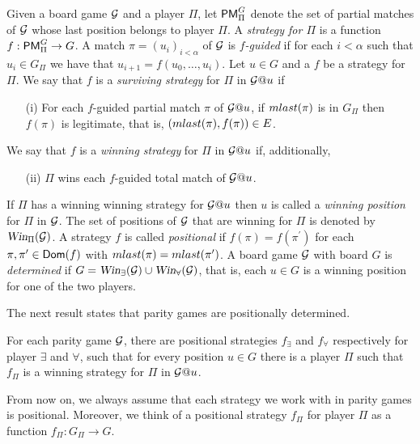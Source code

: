 Given a board game $\mathcal{G}$ and a player $\Pi$, let $\mathsf{PM}^{G}_{\Pi}$ denote
the set of partial matches of $\mathcal{G}$ whose last position belongs to player
$\Pi$.
A \emph{strategy for $\Pi$} is a function $f:\mathsf{PM}^{G}_{\Pi}\to G$.
A match $\pi  = (u_i)_{i< \alpha}$ of $\mathcal{G}$ is
\emph{$f$-guided} if for each $i < \alpha$ such that $u_i \in G_{\Pi}$ we
have that $u_{i+1} = f(u_0,\dots,u_i)$.
%
Let $u \in G$ and a $f$ be a strategy for $\Pi$.
We say that $f$ is a \emph{surviving strategy} for $\Pi$ in $\mathcal{G}@u$ if
%
\begin{enumerate}
  \item[(i)] For each $f$-guided partial match $\pi$ of $\mathcal{G}@u$, if $m{last}(\pi)$
  is in $G_{\Pi}$ then $f(\pi)$ is legitimate, that is,
  $(m{last}(\pi),f(\pi)) \in E$.
\end{enumerate}
%
We say that $f$ is a \emph{winning strategy} for $\Pi$ in $\mathcal{G}@u$ if, additionally, %
%
\begin{enumerate}
  \item[(ii)] $\Pi$ wins each $f$-guided total match of $\mathcal{G}@u$.
\end{enumerate}
%
If $\Pi$ has a winning winning strategy for $\mathcal{G}@u$ then $u$ is called a \emph{winning position} for $\Pi$ in $\mathcal{G}$.
The set of positions of $\mathcal{G}$ that are winning for $\Pi$ is denoted by $\win_{\Pi}(\mc{G})$.
A strategy $f$ is called \emph{positional} if $f(\pi) = f(\pi^{\prime})$ for each $\pi,\pi^{\prime} \in \mathsf{Dom}(f)$ with $m{last}(\pi) = m{last}(\pi^{\prime})$.
A board game $\mathcal{G}$ with board $G$ is \emph{determined} if $G = \win_{\exists}(\mc{G}) \cup \win_{\forall}(\mc{G})$, that is, each $u \in G$ is a winning position for one of the two players.

The next result states that parity games are positionally determined.
\begin{fact}
\label{THM_posDet_ParityGames}
For each parity game $\mathcal{G}$, there are positional strategies $f_{\exists}$
and $f_{\forall}$ respectively for player $\exists$ and $\forall$, such that
for every position $u \in G$ there is a player $\Pi$ such that $f_{\Pi}$ is a
winning strategy for $\Pi$ in $\mathcal{G}@u$.
\end{fact}
%
From now on, we always assume that each strategy we work with in parity games
is positional. Moreover, we think of a positional strategy $f_\Pi$ for player $\Pi$
as a function $f_\Pi:G_\Pi\to G$.